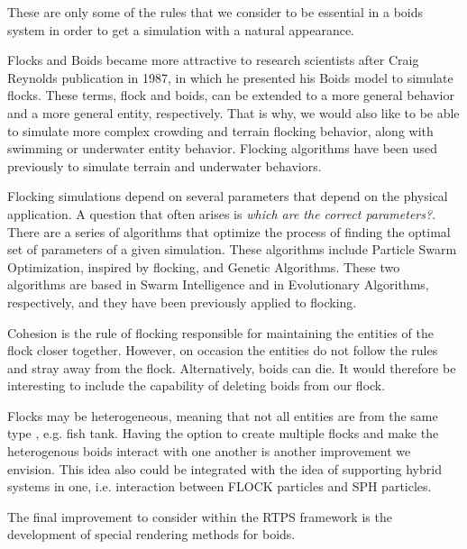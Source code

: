 These are only some of the rules that we consider to be essential in a boids system in order to get a simulation with a natural appearance.

Flocks and Boids became more attractive to research scientists after Craig Reynolds publication in 1987\cite{craig1}, in which he presented his Boids model to simulate flocks. These terms, flock and boids, can be extended to a more general behavior and a more general entity, respectively. That is why, we would also like to be able to simulate more complex crowding and terrain flocking behavior, along with swimming or underwater entity behavior. Flocking algorithms have been used previously to simulate terrain and underwater behaviors\cite{supermassiveCrowd}. 

Flocking simulations depend on several parameters that depend on the physical application. A question that often arises is \textit{which are the correct parameters?}. There are a series of algorithms that optimize the process of finding the optimal set of parameters of a given simulation. These algorithms include Particle Swarm Optimization, inspired by flocking, and Genetic Algorithms. These two algorithms are based in Swarm Intelligence and in Evolutionary Algorithms, respectively, and they have been previously applied to flocking\cite{opt_params_GA}.

Cohesion is the rule of flocking responsible for maintaining the entities of the flock closer together. However, on occasion the entities do not follow the rules and stray away from the flock. Alternatively, boids can die. It would therefore be interesting to include the capability of deleting boids from our flock. 

Flocks may be heterogeneous, meaning that not all entities are from the same type , e.g. fish tank. Having the option to create multiple flocks and make the heterogenous boids interact with one another is another improvement we envision. This idea also could be integrated  with the idea of supporting hybrid systems in one, i.e. interaction between FLOCK particles and SPH particles.

The final improvement to consider within the RTPS framework is the development of special rendering methods for boids. 

